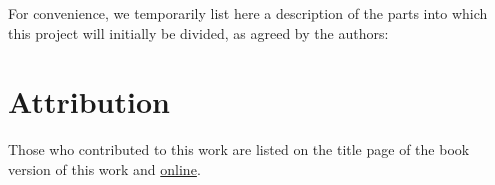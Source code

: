 \medskip\noindent

For convenience, we temporarily list here a description of the parts into which this project will initially be divided, as agreed by the authors:



\section{Attribution}
\label{section-attribution}


\medskip\noindent
Those who contributed to this work are listed on the title page of the book
version of this work and
\href{http://math.jhu.edu/~sakellar/automorphic-project/CONTRIBUTORS}{online}.







